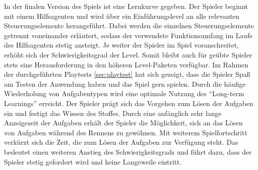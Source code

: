 In der finalen Version des Spiels ist eine Lernkurve gegeben. Der Spieler beginnt mit einem Hilfsagenten und wird über ein Einführungslevel an alle relevanten Steuerungselemente herangeführt. Dabei werden die einzelnen Steuerungselemente getrennt voneinander erläutert, sodass der verwendete Funktionsumfang im Laufe des Hilfsagenten stetig ansteigt. Je weiter der Spieler im Spiel voranschreitet, erhöht sich der Schwierigkeitsgrad der Level. Somit bleibt auch für geübte Spieler stets eine Herausforderung in den höheren Level-Paketen verfügbar. Im Rahmen der durchgeführten Playtests \ref{sec:playtest} hat sich gezeigt, dass die Spieler Spaß am Testen der Anwendung haben und das Spiel gern spielen. Durch die häufige Wiederholung von Aufgabentypen wird eine optimale Nutzung des \enquote{Long-term Learnings} erreicht. Der Spieler prägt sich das Vorgehen zum Lösen der Aufgaben ein und festigt das Wissen des Stoffes. Durch eine anfänglich sehr lange Anzeigezeit der Aufgaben erhält der Spieler die Möglichkeit, sich an das Lösen von Aufgaben während des Rennens zu gewöhnen. Mit weiterem Spielfortschritt verkürzt sich die Zeit, die zum Lösen der Aufgaben zur Verfügung steht. Das bedeutet einen weiteren Anstieg des Schwierigkeitsgrads und führt dazu, dass der Spieler stetig gefordert wird und keine Langeweile eintritt.
